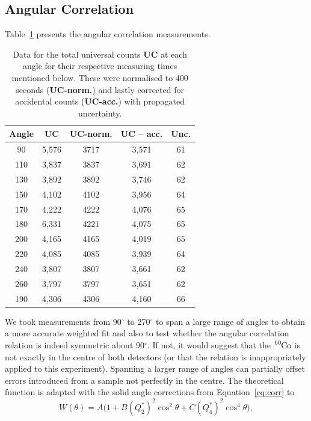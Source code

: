 \documentclass[twocolumn]{article}
\begin{document}
\subsection{Angular Correlation}
Table~\ref{tab:data} presents the angular correlation measurements. 
\begin{table}[htbp]
	\centering
	\begin{tabular}{c||c|c||c|c}
		\hline
		\textbf{Angle} & \textbf{UC} & \textbf{UC-norm.} & \textbf{UC -- acc.} & \textbf{Unc.} \\ \hline \hline
		90    & 5,576 & 3717  & 3,571 & 61 \\ \hline
		110   & 3,837 & 3837  & 3,691 & 62 \\ \hline
		130   & 3,892 & 3892  & 3,746 & 62 \\ \hline
		150   & 4,102 & 4102  & 3,956 & 64 \\ \hline
		170   & 4,222 & 4222  & 4,076 & 65 \\ \hline
		180   & 6,331 & 4221  & 4,075 & 65 \\ \hline
		200   & 4,165 & 4165  & 4,019 & 65 \\ \hline
		220   & 4,085 & 4085  & 3,939 & 64 \\ \hline
		240   & 3,807 & 3807  & 3,661 & 62 \\ \hline
		260   & 3,797 & 3797  & 3,651 & 62 \\ \hline
		190   & 4,306 & 4306  & 4,160 & 66 \\ \hline \hline

	\end{tabular}%
			\caption{Data for the total universal counts \textbf{UC} at each angle for their respective measuring times mentioned below. These were normalised to 400 seconds (\textbf{UC-norm.}) and lastly corrected for accidental counts (\textbf{UC-acc.}) with propagated uncertainty.} 
	\label{tab:data}%
\end{table}%
We took measurements from 90$^{\circ}$ to 270$^{\circ}$ to span a large range of angles to obtain a more accurate weighted fit and also to test whether the angular correlation relation is indeed symmetric about 90$^{\circ}$. If not, it would suggest that the $\ce{^{60}Co}$ is not exactly in the centre of both detectors (or that the relation is inappropriately applied to this experiment). Spanning a larger range of angles can partially offset errors introduced from a sample not perfectly in the centre. The theoretical function is adapted with the solid angle corrections from Equation~\ref{eq:corr} to
\begin{equation}
W(\theta) = A \big(1 + B (Q^{*}_2)^2 \cos^2 \theta + C (Q^{*}_4)^2 \cos^4 \theta \big), \label{eq:fit}
\end{equation} 
\end{document}
